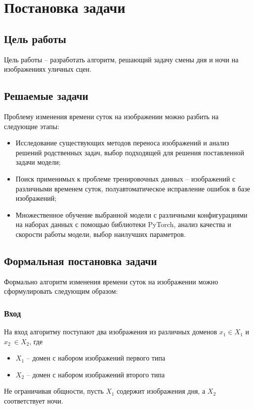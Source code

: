 \documentclass[11pt,a4paper]{extarticle}
\begin{document}
\newpage
\section{Постановка задачи}

	\subsection{Цель работы}

		Цель работы -- разработать алгоритм, решающий задачу смены дня и ночи на изображениях уличных сцен.

	\subsection{Решаемые задачи}

		Проблему изменения времени суток на изображении можно разбить на следующие этапы:
		\newline
		\begin{itemize}
			\vspace{-1em}
			\item Исследование существующих методов переноса изображений и анализ решений родственных задач, выбор подходящей для решения поставленной задачи модели;
			\item Поиск применимых к проблеме тренировочных данных -- изображений с различными временем суток, полуавтоматическое исправление ошибок в базе изображений;
			\item Множественное обучение выбранной модели с различными конфигурациями на наборах данных с помощью библиотеки PyTorch, анализ качества и скорости работы модели, выбор наилучших параметров.
		\end{itemize}

	\subsection{Формальная постановка задачи}\label{intro_problem}

		Формально алгоритм изменения времени суток на изображении можно сформулировать следующим образом:
		\vspace{-1em}
		\subsubsection*{Вход}
			На вход алгоритму поступают два изображения из различных доменов \(x_{1} \in X_{1}\)  и \(x_{2}\ \in X_{2}\), где
			\begin{itemize}
				\item \(X_{1}\) -- домен с набором изображений первого типа
				\item \(X_{2}\) -- домен с набором изображений второго типа
			\end{itemize}
			Не ограничивая общности, пусть \(X_{1}\) содержит изображения дня, а \(X_{2}\) соответствует ночи.
		\vspace{-1em}
\end{document}
